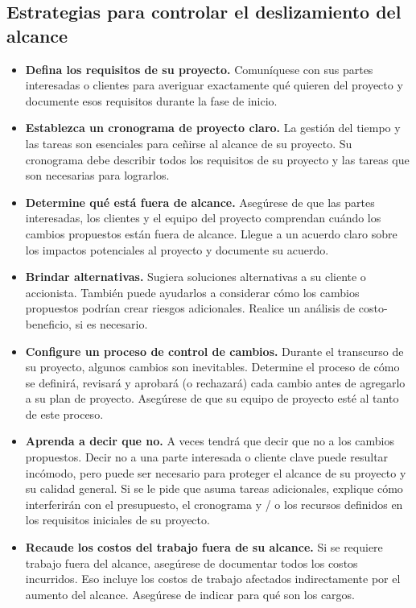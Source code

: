 \documentclass[10pt]{book}
\begin{document}
    \subsection{Estrategias para controlar el deslizamiento del alcance}
    \begin{itemize}
	\item \textbf{Defina los requisitos de su proyecto.} Comuníquese con sus partes interesadas o clientes para averiguar exactamente qué quieren del proyecto y documente esos requisitos durante la fase de inicio. 
	\item \textbf{Establezca un cronograma de proyecto claro.} La gestión del tiempo y las tareas son esenciales para ceñirse al alcance de su proyecto. Su cronograma debe describir todos los requisitos de su proyecto y las tareas que son necesarias para lograrlos.
	\item \textbf{Determine qué está fuera de alcance.} Asegúrese de que las partes interesadas, los clientes y el equipo del proyecto comprendan cuándo los cambios propuestos están fuera de alcance. Llegue a un acuerdo claro sobre los impactos potenciales al proyecto y documente su acuerdo. 
	\item \textbf{Brindar  alternativas.} Sugiera soluciones alternativas a su cliente o accionista. También puede ayudarlos a considerar cómo los cambios propuestos podrían crear riesgos adicionales. Realice un análisis de costo-beneficio, si es necesario.
	\item \textbf{Configure un proceso de control de cambios.} Durante el transcurso de su proyecto, algunos cambios son inevitables. Determine el proceso de cómo se definirá, revisará y aprobará (o rechazará) cada cambio antes de agregarlo a su plan de proyecto. Asegúrese de que su equipo de proyecto esté al tanto de este proceso.
	\item \textbf{Aprenda a decir que no.} A veces tendrá que decir que no a los cambios propuestos. Decir no a una parte interesada o cliente clave puede resultar incómodo, pero puede ser necesario para proteger el alcance de su proyecto y su calidad general. Si se le pide que asuma tareas adicionales, explique cómo interferirán con el presupuesto, el cronograma y / o los recursos definidos en los requisitos iniciales de su proyecto. 
	\item \textbf{Recaude los  costos del trabajo fuera de su alcance.} Si se requiere trabajo fuera del alcance, asegúrese de  documentar todos los costos incurridos. Eso incluye los costos de trabajo afectados indirectamente por el aumento del alcance. Asegúrese de indicar para qué son los cargos. 
    \end{itemize}
\end{document}

